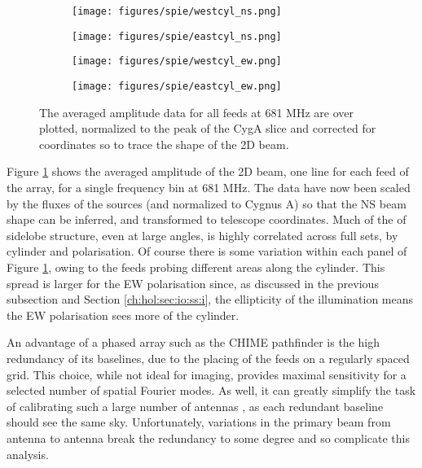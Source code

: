 \begin{figure}[ht] %
	\centering
	\begin{subfigure}[b]{0.49\textwidth}
		\texttt{[image: figures/spie/westcyl\_ns.png]}%
	\end{subfigure}
	\begin{subfigure}[b]{0.465\textwidth}
		\texttt{[image: figures/spie/eastcyl\_ns.png]}%
	\end{subfigure}
	\begin{subfigure}[b]{0.49\textwidth}
		\texttt{[image: figures/spie/westcyl\_ew.png]}%
	\end{subfigure}
	\begin{subfigure}[b]{0.46\textwidth}
		\texttt{[image: figures/spie/eastcyl\_ew.png]}%
	\end{subfigure}
\caption{The averaged amplitude data for all feeds at 681 MHz are over plotted, normalized to the peak of the CygA slice and corrected for coordinates so to trace the shape of the 2D beam. }
\label{allfeeds}
\end{figure}

Figure \ref{allfeeds} shows the averaged amplitude of the 2D beam, one line for each feed of the array, for a single frequency bin at 681 MHz. The data have now been scaled by the fluxes of the sources (and normalized to Cygnus A) so that the NS beam shape can be inferred, and transformed to telescope coordinates. Much of the of sidelobe structure, even at large angles, is highly correlated across full sets, by cylinder and polarisation. Of course there is some variation within each panel of Figure \ref{allfeeds}, owing to the feeds probing different areas along the cylinder. This spread is larger for the EW polarisation since, as discussed in the previous subsection and Section \ref{ch:hol:sec:io:ss:i}, the ellipticity of the illumination means the EW polarisation sees more of the cylinder.

An advantage of a phased array such as the CHIME pathfinder is the high redundancy of its baselines, due to the placing of the feeds on a regularly spaced grid. This choice, while not ideal for imaging, provides maximal sensitivity for a selected number of spatial Fourier modes. As well, it can greatly simplify the task of calibrating such a large number of antennas \citep{redundantbaselines}, as each redundant baseline should see the same sky. Unfortunately, variations in the primary beam from antenna to antenna break the redundancy to some degree and so complicate this analysis.

